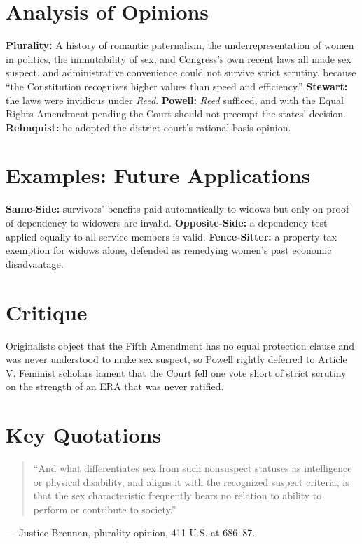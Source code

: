 \documentclass[12pt]{article}
\begin{document}
\section{Analysis of Opinions}
\textbf{Plurality:} A history of romantic paternalism, the underrepresentation of women in politics, the immutability of sex, and Congress's own recent laws all made sex suspect, and administrative convenience could not survive strict scrutiny, because ``the Constitution recognizes higher values than speed and efficiency.'' \textbf{Stewart:} the laws were invidious under \textit{Reed}. \textbf{Powell:} \textit{Reed} sufficed, and with the Equal Rights Amendment pending the Court should not preempt the states' decision. \textbf{Rehnquist:} he adopted the district court's rational-basis opinion.

\section{Examples: Future Applications}
\textbf{Same-Side:} survivors' benefits paid automatically to widows but only on proof of dependency to widowers are invalid. \textbf{Opposite-Side:} a dependency test applied equally to all service members is valid. \textbf{Fence-Sitter:} a property-tax exemption for widows alone, defended as remedying women's past economic disadvantage.

\section{Critique}
Originalists object that the Fifth Amendment has no equal protection clause and was never understood to make sex suspect, so Powell rightly deferred to Article V. Feminist scholars lament that the Court fell one vote short of strict scrutiny on the strength of an ERA that was never ratified.

\section{Key Quotations}
\begin{quote}
``And what differentiates sex from such nonsuspect statuses as intelligence or physical disability, and aligns it with the recognized suspect criteria, is that the sex characteristic frequently bears no relation to ability to perform or contribute to society.''
\end{quote}
\noindent --- Justice Brennan, plurality opinion, 411 U.S. at 686--87.
\end{document}
